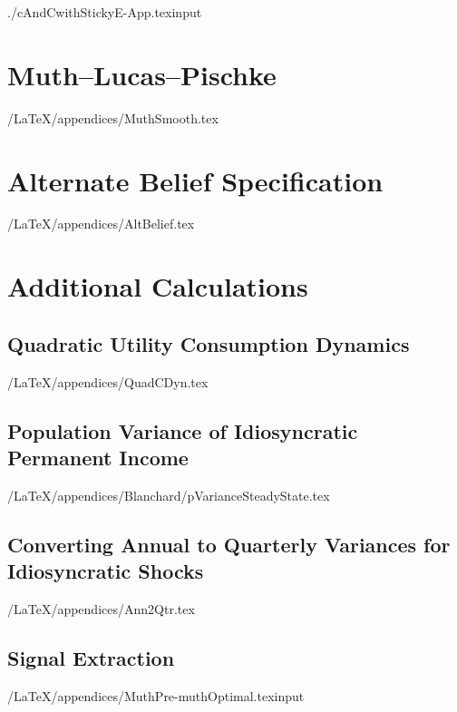 \documentclass[titlepage]{\econtex}
\newcommand{\texname}{cAndCwithStickyE-App}
\begin{document}
\begin{verbatimwrite}{./cAndCwithStickyE-App.texinput}
\section{Muth--Lucas--Pischke}

\econtexRoot/LaTeX/appendices/MuthSmooth.tex


\section{Alternate Belief Specification}\label{appendix:AltBelief}

\econtexRoot/LaTeX/appendices/AltBelief.tex


\section{Additional Calculations}

\subsection{Quadratic Utility Consumption Dynamics}\label{appendix:QuadCDyn}

\econtexRoot/LaTeX/appendices/QuadCDyn.tex







\subsection{Population Variance of Idiosyncratic Permanent Income}\label{appendix:pss}

\econtexRoot/LaTeX/appendices/Blanchard/pVarianceSteadyState.tex

\subsection{Converting Annual to Quarterly Variances for Idiosyncratic Shocks}\label{appendix:Ann2Qtr}

\econtexRoot/LaTeX/appendices/Ann2Qtr.tex

\subsection{\cite{muthOptimal} Signal Extraction}\label{appendix:Muth}

\econtexRoot/LaTeX/appendices/MuthPre-muthOptimal.texinput

\end{verbatimwrite}


\small

\normalsize
\end{document}
